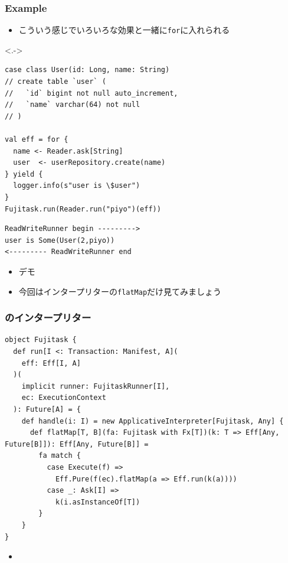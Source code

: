 \begin{frame}[fragile]
  \frametitle{Example}

  \begin{itemize}
    \item<+-> こういう感じでいろいろな効果と一緒に\lstinline|for|に入れられる
  \end{itemize}

  \begin{uncoverenv}<.->
\begin{lstlisting}[style=scala]
case class User(id: Long, name: String)
// create table `user` (
//   `id` bigint not null auto_increment,
//   `name` varchar(64) not null
// )

val eff = for {
  name <- Reader.ask[String]
  user  <- userRepository.create(name)
} yield {
  logger.info(s"user is \$user")
}
Fujitask.run(Reader.run("piyo")(eff)) 
\end{lstlisting}

\begin{lstlisting}[style=plain]
ReadWriteRunner begin --------->
user is Some(User(2,piyo))
<--------- ReadWriteRunner end
\end{lstlisting}  
  \end{uncoverenv}
 
  \begin{itemize}
    \item<+-> デモ
    \item<+-> 今回はインタープリターの\lstinline|flatMap|だけ見てみましょう
  \end{itemize}
\end{frame}

\begin{frame}[fragile]
  \frametitle{\Fujitask のインタープリター}

\begin{lstlisting}[style=scala]
object Fujitask {
  def run[I <: Transaction: Manifest, A](
    eff: Eff[I, A]
  )(
    implicit runner: FujitaskRunner[I],
    ec: ExecutionContext
  ): Future[A] = {
    def handle(i: I) = new ApplicativeInterpreter[Fujitask, Any] {
      def flatMap[T, B](fa: Fujitask with Fx[T])(k: T => Eff[Any, Future[B]]): Eff[Any, Future[B]] =
        fa match {
          case Execute(f) =>
            Eff.Pure(f(ec).flatMap(a => Eff.run(k(a))))
          case _: Ask[I] =>
            k(i.asInstanceOf[T])
        }
    }
}
\end{lstlisting}

  \begin{itemize}
    \item<+-> 
  \end{itemize}
\end{frame}

